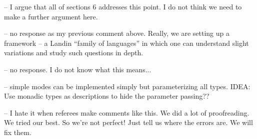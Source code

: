 
-- I argue that all of sections 6 addresses this point.
I do not think we need to make a further argument here.


-- no response as my previous comment above.  Really, we are setting
   up a framework -- a Landin ``family of languages'' in which one can
   understand slight variations and study such questions in depth.


-- no response.  I do not know what this means...


-- simple modes can be implemented simply but parameterizing all types.
IDEA:  Use monadic types as descriptions to hide the parameter passing??


-- I hate it when referees make comments like this.  We did a lot of
proofreading.  We tried our best.  So we're not perfect!  Just tell us
where the errors are. We will fix them.

